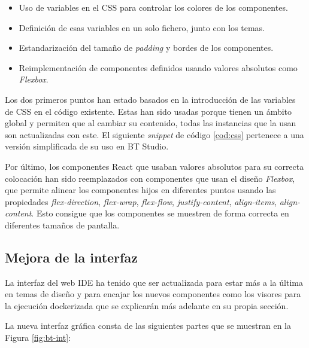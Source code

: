 \begin{itemize}
    \item Uso de variables en el CSS para controlar los colores de los componentes.
    \item Definición de esas variables en un solo fichero, junto con los temas.
    \item Estandarización del tamaño de \textit{padding} y bordes de los componentes.
    \item Reimplementación de componentes definidos usando valores absolutos como \textit{Flexbox}.
\end{itemize}

Los dos primeros puntos han estado basados en la introducción de las variables de CSS en el código existente. Estas han sido usadas porque tienen un ámbito global y permiten que al cambiar su contenido, todas las instancias que la usan son actualizadas con este. El siguiente \textit{snippet} de código \ref{cod:css} pertenece a una versión simplificada de su uso en BT Studio.

Por último, los componentes React que usaban valores absolutos para su correcta colocación han sido reemplazados con componentes que usan el diseño \textit{Flexbox}, que permite alinear los componentes hijos en diferentes puntos usando las propiedades \textit{flex-direction}, \textit{flex-wrap}, \textit{flex-flow}, \textit{justify-content}, \textit{align-items}, \textit{align-content}. Esto consigue que los componentes se muestren de forma correcta en diferentes tamaños de pantalla.



\subsection{Mejora de la interfaz}

La interfaz del web IDE ha tenido que ser actualizada para estar más a la última en temas de diseño y para encajar los nuevos componentes como los visores para la ejecución dockerizada que se explicarán más adelante en su propia sección.

La nueva interfaz gráfica consta de las siguientes partes que se muestran en la Figura \ref{fig:bt-int}:

